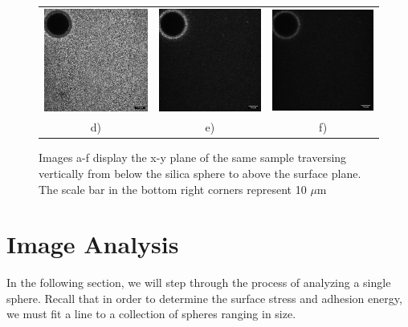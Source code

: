 \begin{figure}[h!]
\begin{tabular}{ccc}
		\includegraphics[width= .33\linewidth]{Chapters/Figures/190215_g91_glass_sphere011_cascade4.png} & \includegraphics[width= .33\linewidth]{Chapters/Figures/190215_g91_glass_sphere011_cascade5.png} & \includegraphics[width= .33\linewidth]{Chapters/Figures/190215_g91_glass_sphere011_cascade6.png}
		\\
		d) & e) & f) 
	\end{tabular}
	\caption[Vertical path through image stack]{Images a-f display the x-y plane of the same sample traversing vertically from below the silica sphere to above the surface plane. The scale bar in the bottom right corners represent 10 $\mu$m}
\end{figure}


\section{Image Analysis}
In the following section, we will step through the process of analyzing a single sphere. Recall that in order to determine the surface stress and adhesion energy, we must fit a line to a collection of spheres ranging in size.  

